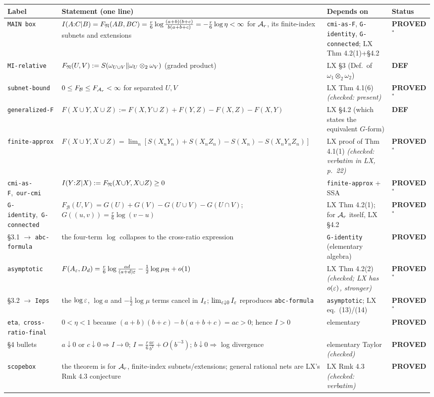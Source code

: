 \documentclass[11pt]{article}
\newcommand{\stPR}{{\color{okgreen}\textsf{\scriptsize\bfseries PROVED}}}
\newcommand{\stPMC}{{\color{teal}\textsf{\scriptsize\bfseries PROVED$^\ast$}}}
\newcommand{\stDEF}{{\textsf{\scriptsize\bfseries DEF}}}
\newcommand{\CMI}{I}
\newcommand{\MI}{F}
\renewcommand{\cB}{\mathcal B}
\begin{document}
{\footnotesize\setlength{\emergencystretch}{4em}\sloppy{}\relax{}\relax
\begin{tabularx}{\textwidth}{L{0.150\textwidth} X L{0.215\textwidth} L{0.098\textwidth}}
\toprule
\textbf{Label} & \textbf{Statement (one line)} & \textbf{Depends on} & \textbf{Status}\\
\midrule\endhead
\texttt{MAIN box} & $\CMI(A{:}C|B)=\MI_{\cN}(AB,BC)=\frac r6\log\frac{(a+b)(b+c)}{b(a+b+c)}=-\frac r6\log\eta<\infty$ for $\mathcal A_r$, its finite-index subnets and extensions & \texttt{cmi-as-F}, \texttt{G-identity}, \texttt{G-connected}; LX Thm 4.2(1)+\S4.2 & \stPMC \\
\texttt{MI-relative} & $\MI_\cN(U,V):=S(\omega_{U\cup V}\Vert\omega_U\otimes_2\omega_V)$ (graded product) & LX \S3 (Def.\ of $\omega_1\otimes_2\omega_2$) & \stDEF \\
\texttt{subnet-bound} & $0\le\MI_\cB\le\MI_{\cA_r}<\infty$ for separated $U,V$ & LX Thm 4.1(6) \emph{(checked: present)} & \stPMC \\
\texttt{generalized-F} & $\MI(X{\cup}Y,X{\cup}Z):=\MI(X,Y{\cup}Z)+\MI(Y,Z)-\MI(X,Z)-\MI(X,Y)$ & LX \S4.2 (which states the equivalent $G$-form) & \stDEF \\
\texttt{finite-approx} & $\MI(X{\cup}Y,X{\cup}Z)=\lim_n[S(X_nY_n)+S(X_nZ_n)-S(X_n)-S(X_nY_nZ_n)]$ & LX proof of Thm 4.1(1) \emph{(checked: verbatim in LX, p.~22)} & \stPMC \\
\texttt{cmi-as-F},\allowbreak\ \texttt{our-cmi} & $\CMI(Y{:}Z|X):=\MI_\cN(X{\cup}Y,X{\cup}Z)\ge0$ & \texttt{finite-approx} + SSA & \stPMC \\
\texttt{G-identity},\allowbreak\ \texttt{G-connected} & $\MI_\cB(U,V)=G(U)+G(V)-G(U{\cup}V)-G(U{\cap}V)$; $G((u,v))=\frac r6\log(v-u)$ & LX Thm 4.2(1); for $\mathcal A_r$ itself, LX \S4.2 & \stPMC \\
\S3.1 $\to$ \texttt{abc-formula} & the four-term $\log$ collapses to the cross-ratio expression & \texttt{G-identity} (elementary algebra) & \stPR \\
\texttt{asymptotic} & $\MI(A_\eps,D_d)=\frac r6\log\frac{ad}{(a+d)\eps}-\frac12\log\mu_\cN+o(1)$ & LX Thm 4.2(2) \emph{(checked; LX has $o(\varepsilon)$, stronger)} & \stPMC \\
\S3.2 $\to$ \texttt{Ieps} & the $\log\varepsilon$, $\log a$ and $-\frac12\log\mu$ terms cancel in $I_\varepsilon$; $\lim_{\varepsilon\downarrow0}I_\varepsilon$ reproduces \texttt{abc-formula} & \texttt{asymptotic}; LX eq.~(13)/(14) & \stPMC \\
\texttt{eta},\allowbreak\ \texttt{cross-\allowbreak ratio-\allowbreak final} & $0<\eta<1$ because $(a{+}b)(b{+}c)-b(a{+}b{+}c)=ac>0$; hence $\CMI>0$ & elementary & \stPR \\
\S4 bullets & $a\downarrow0$ or $c\downarrow0\Rightarrow\CMI\to0$; $\CMI=\frac r6\frac{ac}{b^2}+O(b^{-3})$; $b\downarrow0\Rightarrow$ log divergence & elementary Taylor \emph{(checked)} & \stPR \\
\texttt{scopebox} & the theorem is for $\mathcal A_r$, finite-index subnets/extensions; general rational nets are LX's Rmk 4.3 conjecture & LX Rmk 4.3 \emph{(checked: verbatim)} & \stPR \\
\bottomrule
\end{tabularx}}
\end{document}
